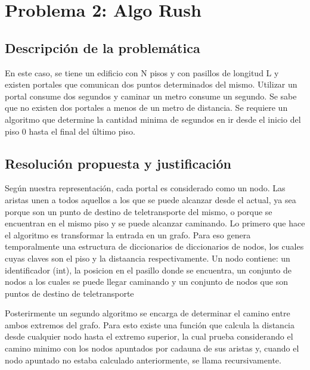\section{Problema 2: Algo Rush}

\subsection{Descripción de la problemática}
En este caso, se tiene un edificio con N pisos y con pasillos de longitud L y existen portales que comunican dos puntos determinados del mismo. Utilizar un portal consume dos segundos y caminar un metro consume un segundo. Se sabe que no existen dos portales a menos de un metro de distancia.
Se requiere un algoritmo que determine la cantidad minima de segundos en ir desde el inicio del piso 0 hasta el final del último piso.

\subsection{Resolución propuesta y justificación}
Según nuestra representación, cada portal es considerado como un nodo. Las aristas unen a todos aquellos a los que se puede alcanzar desde el actual, ya sea porque son un punto de destino de teletransporte del mismo, o porque se encuentran en el mismo piso y se puede alcanzar caminando.
Lo primero que hace el algoritmo es transformar la entrada en un grafo. Para eso genera temporalmente una estructura de diccionarios de diccionarios de nodos, los cuales cuyas claves son el piso y la distaancia respectivamente.
Un nodo contiene: un identificador (int), la posicion en el pasillo donde se encuentra, un conjunto de nodos a los cuales se puede llegar caminando y un conjunto de nodos que son puntos de destino de teletransporte

Posterirmente un segundo algoritmo se encarga de determinar el camino entre ambos extremos del grafo. Para esto existe una función que calcula la distancia desde cualquier nodo hasta el extremo superior, la cual prueba considerando el camino minimo con los nodos apuntados por cadauna de sus aristas y, cuando el nodo apuntado no estaba calculado anteriormente, se llama recursivamente.

